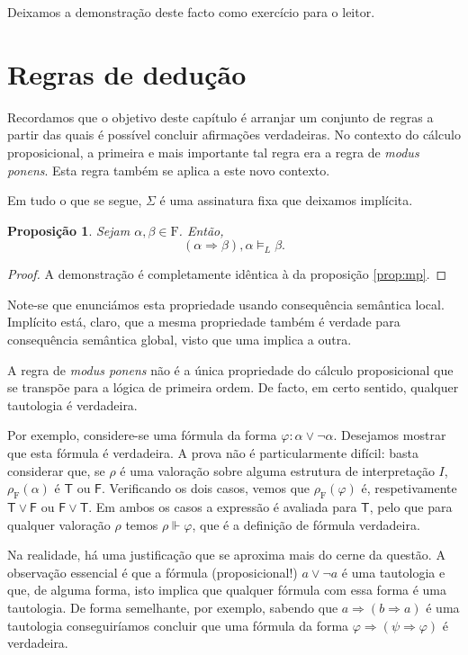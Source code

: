 \documentclass{report}
\newtheorem{prop}{Proposição}
\theoremstyle{definition}
\theoremstyle{remark}
\newcommand{\F}{\mathrm{F}}
\newcommand{\lt}{\mathsf{T}}
\newcommand{\lf}{\mathsf{F}}
\newcommand{\imply}{\mathbin{\Rightarrow}}
\begin{document}
	Deixamos a demonstração deste facto como exercício para o leitor.
	
	\section{Regras de dedução}
	
	Recordamos que o objetivo deste capítulo é arranjar um conjunto de regras a partir das quais é possível concluir afirmações verdadeiras. No contexto do cálculo proposicional, a primeira e mais importante tal regra era a regra de \textit{modus ponens}. Esta regra também se aplica a este novo contexto.
	
	Em tudo o que se segue, $\Sigma$ é uma assinatura fixa que deixamos implícita.
	
	\begin{prop}
	Sejam $\alpha, \beta \in \F$. Então,
	\[(\alpha \imply \beta), \alpha \vDash_L \beta.\]
	\end{prop}
	
	\begin{proof}
	A demonstração é completamente idêntica à da proposição \ref{prop:mp}.
	\end{proof}
	
	Note-se que enunciámos esta propriedade usando consequência semântica local. Implícito está, claro, que a mesma propriedade também é verdade para consequência semântica global, visto que uma implica a outra.
	
	A regra de \emph{modus ponens} não é a única propriedade do cálculo proposicional que se transpõe para a lógica de primeira ordem. De facto, em certo sentido, qualquer tautologia é verdadeira.
	
	Por exemplo, considere-se uma fórmula da forma $\varphi : \alpha \lor \neg \alpha$. Desejamos mostrar que esta fórmula é verdadeira. A prova não é particularmente difícil: basta considerar que, se $\rho$ é uma valoração sobre alguma estrutura de interpretação $I$, $\rho_\F(\alpha)$ é $\lt$ ou $\lf$. Verificando os dois casos, vemos que $\rho_\F(\varphi)$ é, respetivamente $\lt \lor \lf$ ou $\lf \lor \lt$. Em ambos os casos a expressão é avaliada para $\lt$, pelo que para qualquer valoração $\rho$ temos $\rho \Vdash \varphi$, que é a definição de fórmula verdadeira.
	
	Na realidade, há uma justificação que se aproxima mais do cerne da questão. A observação essencial é que a fórmula (proposicional!) $a \lor \neg a$ é uma tautologia e que, de alguma forma, isto implica que qualquer fórmula com essa forma é uma tautologia. De forma semelhante, por exemplo, sabendo que $a \imply (b \imply a)$ é uma tautologia conseguiríamos concluir que uma fórmula da forma $\varphi \imply (\psi \imply \varphi)$ é verdadeira.
	
\end{document}
